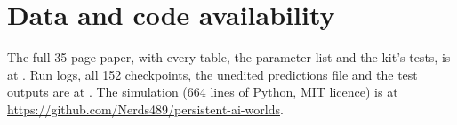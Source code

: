 \documentclass[letterpaper]{article}
\begin{document}
\section{Data and code availability}

The full 35-page paper, with every table, the parameter list and the kit's tests, is at
\citet{bremner2026paper}. Run logs, all 152 checkpoints, the unedited predictions file and the test
outputs are at \citet{bremner2026data}. The simulation (664 lines of Python, MIT licence) is at
\url{https://github.com/Nerds489/persistent-ai-worlds}.

\clearpage
\footnotesize


\end{document}
